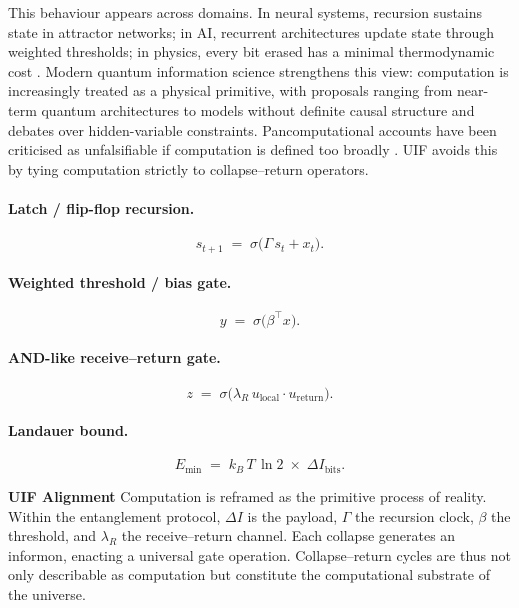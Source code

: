 This behaviour appears across domains. In neural systems, recursion sustains state in attractor networks; in AI, recurrent architectures update state through weighted thresholds; in physics, every bit erased has a minimal thermodynamic cost \cite{Landauer1961}. Modern quantum information science strengthens this view: computation is increasingly treated as a physical primitive, with proposals ranging from near-term quantum architectures \cite{Preskill2018} to models without definite causal structure \cite{Chiribella2020} and debates over hidden-variable constraints. Pancomputational accounts have been criticised as unfalsifiable if computation is defined too broadly \cite{Searle1990}. UIF avoids this by tying computation strictly to collapse–return operators.

\paragraph{Latch / flip-flop recursion.}
\begin{equation}
\label{eq:68}
s_{t+1} \;=\; \sigma\!\big(\Gamma\, s_t + x_t\big).
\end{equation}

\paragraph{Weighted threshold / bias gate.}
\begin{equation}
\label{eq:69}
y \;=\; \sigma\!\big(\beta^{\top} x\big).
\end{equation}

\paragraph{AND-like receive–return gate.}
\begin{equation}
\label{eq:610}
z \;=\; \sigma\!\big(\lambda_R\, u_{\text{local}} \cdot u_{\text{return}}\big).
\end{equation}

\paragraph{Landauer bound.}
\begin{equation}
\label{eq:611}
E_{\min} \;=\; k_B\,T\,\ln 2 \;\times\; \Delta I_{\text{bits}}.
\end{equation}
\newline

\noindent
\textbf{UIF Alignment} 
\newline Computation is reframed as the primitive process of reality. Within the entanglement protocol, $\Delta I$ is the payload, $\Gamma$ the recursion clock, $\beta$ the threshold, and $\lambda_R$ the receive–return channel. Each collapse generates an informon, enacting a universal gate operation. Collapse–return cycles are thus not only describable as computation but constitute the computational substrate of the universe.
\newline

